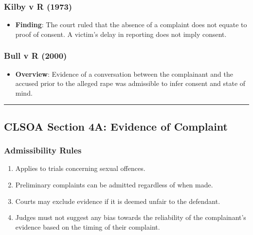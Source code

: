 \subsubsection{Kilby v R (1973)}\label{kilby-v-r-1973}

\begin{itemize}
\tightlist
\item
  \textbf{Finding}: The court ruled that the absence of a complaint does
  not equate to proof of consent. A victim's delay in reporting does not
  imply consent.
\end{itemize}

\subsubsection{Bull v R (2000)}\label{bull-v-r-2000}

\begin{itemize}
\tightlist
\item
  \textbf{Overview}: Evidence of a conversation between the complainant
  and the accused prior to the alleged rape was admissible to infer
  consent and state of mind.
\end{itemize}

\begin{center}\rule{0.5\linewidth}{0.5pt}\end{center}

\subsection{ CLSOA Section 4A: Evidence of
Complaint}\label{clsoa-section-4a-evidence-of-complaint}

\subsubsection{Admissibility Rules}\label{admissibility-rules-1}

\begin{enumerate}
\def\labelenumi{\arabic{enumi}.}
\tightlist
\item
  Applies to trials concerning sexual offences.
\item
  Preliminary complaints can be admitted regardless of when made.
\item
  Courts may exclude evidence if it is deemed unfair to the defendant.
\item
  Judges must not suggest any bias towards the reliability of the
  complainant's evidence based on the timing of their complaint.
\end{enumerate}

